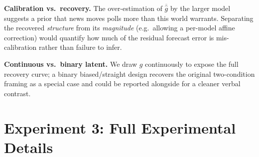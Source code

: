 \documentclass{article} %
\begin{document}
\textbf{Calibration vs.\ recovery.}  The over-estimation of $\overline{\hat g}$ by the larger
model suggests a prior that news moves polls more than this world warrants.  Separating the
recovered \emph{structure} from its \emph{magnitude} (e.g.\ allowing a per-model affine
correction) would quantify how much of the residual forecast error is mis-calibration rather than
failure to infer.

\textbf{Continuous vs.\ binary latent.}  We draw $g$ continuously to expose the full recovery
curve; a binary biased/straight design recovers the original two-condition framing as a special
case and could be reported alongside for a cleaner verbal contrast.



\section{Experiment 3: Full Experimental Details}
\label{app:exp3}
\end{document}
